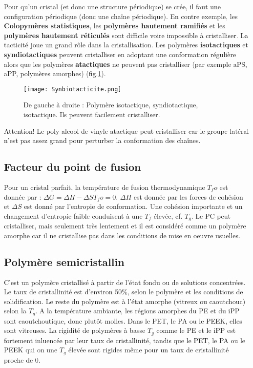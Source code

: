 \documentclass[../main.tex]{subfiles}
\begin{document}
	Pour qu'un cristal (et donc une structure périodique) se crée, il faut une configuration périodique (donc une chaîne périodique). En contre exemple, les \textbf{Colopymères statistiques}, les \textbf{polymères hautement ramifiés} et les \textbf{polymères hautement réticulés} sont difficile voire impossible à cristalliser. 
	La tacticité joue un grand rôle dans la cristallisation. Les polymères \textbf{isotactiques} et \textbf{syndiotactiques} peuvent cristalliser en adoptant une conformation régulière alors que les polymères \textbf{atactiques} ne peuvent pas cristalliser (par exemple aPS, aPP, polymères amorphes) (fig.\ref{syndiotacticite}).
	
	\begin{figure}
		\begin{center}
			\texttt{[image: Synbiotacticite.png]}
			\caption{\label{syndiotacticite}De gauche à droite : Polymère isotactique, syndiotactique, isotactique. Ils peuvent facilement cristalliser.}
		\end{center}
	\end{figure}
	Attention! Le poly alcool de vinyle atactique peut cristalliser car le groupe latéral n'est pas assez grand pour perturber la conformation des chaînes. 
	\subsection{Facteur du point de fusion}
	Pour un cristal parfait, la température de fusion thermodynamique $T_fo$ est donnée par : $\Delta G = \Delta H - \Delta ST_fo = 0$. $\Delta H$ est donnée par les forces de cohésion et $\Delta S$ est donné par l'entropie de conformation. Une cohésion importante et un changement d'entropie faible conduisent à une $T_f$ élevée, cf. $T_g$.
	Le PC peut cristalliser, mais seulement très lentement et il est considéré comme un polymère amorphe car il ne cristallise pas dans les conditions de mise en oeuvre usuelles. 
	\subsection{Polymère semicristallin}
	C'est un polymère cristallisé à partir de l'état fondu ou de solutions concentrées. Le taux de cristallinité est d'environ 50\%, selon le polymère et les conditions de solidification. Le reste du polymère est à l'état amorphe (vitreux ou caoutchouc) selon la $T_g$. A la température ambiante, les régions amorphes du PE et du iPP sont caoutchoutique, donc plutôt molles. Dans le PET, le PA ou le PEEK, elles sont vitreuses. La rigidité de polymères à basse $T_g$ comme le PE et le iPP est fortement inluencée par leur taux de cristallinité, tandis que le PET, le PA ou le PEEK qui on une $T_g$ élevée sont rigides même pour un taux de cristallinité proche de 0.
\end{document}
